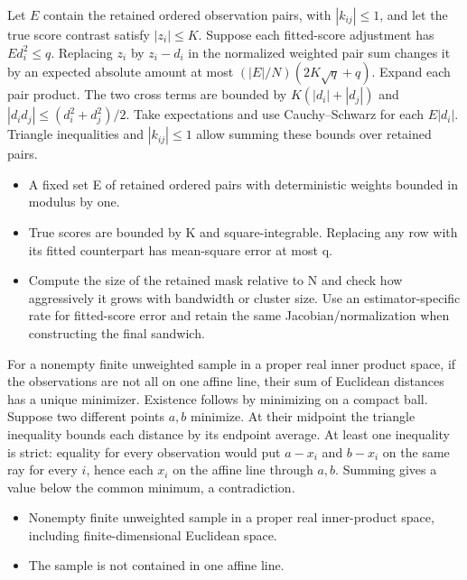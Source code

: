 \expandafter\def\csname statadic@statement@STATADIC-COVBRIDGE-001\endcsname{Let $E$ contain the retained ordered observation pairs,
  with $|k_{ij}|\le1$, and let the true score contrast satisfy $|z_i|\le K$.
  Suppose each fitted-score adjustment has $E d_i^2\le q$. Replacing $z_i$
  by $z_i-d_i$ in the normalized weighted pair sum changes it by an expected
  absolute amount at most $(|E|/N)(2K\sqrt q+q)$.}
\expandafter\def\csname statadic@proof@STATADIC-COVBRIDGE-001\endcsname{Expand each pair product. The two cross terms are bounded by
  $K(|d_i|+|d_j|)$ and $|d_i d_j|\le(d_i^2+d_j^2)/2$. Take expectations
  and use Cauchy--Schwarz for each $E|d_i|$. Triangle inequalities and
  $|k_{ij}|\le1$ allow summing these bounds over retained pairs.}
\expandafter\def\csname statadic@assumptions@STATADIC-COVBRIDGE-001\endcsname{\begin{itemize}
\item A fixed set E of retained ordered pairs with deterministic weights bounded in modulus by one.
\item True scores are bounded by K and square-integrable. Replacing any row with its fitted counterpart has mean-square error at most q.
\end{itemize}}
\expandafter\def\csname statadic@diagnostics@STATADIC-COVBRIDGE-001\endcsname{\begin{itemize}
\item Compute the size of the retained mask relative to N and check how aggressively it grows with bandwidth or cluster size. Use an estimator-specific rate for fitted-score error and retain the same Jacobian/normalization when constructing the final sandwich.
\end{itemize}}
\expandafter\def\csname statadic@statement@STATADIC-MEDIAN-004\endcsname{For a nonempty finite unweighted sample in a proper real inner
  product space, if the observations are not all on one affine line, their
  sum of Euclidean distances has a unique minimizer.}
\expandafter\def\csname statadic@proof@STATADIC-MEDIAN-004\endcsname{Existence follows by minimizing on a compact ball. Suppose two
  different points $a,b$ minimize. At their midpoint the triangle inequality
  bounds each distance by its endpoint average. At least one inequality is strict:
  equality for every observation would put $a-x_i$ and $b-x_i$ on the same ray
  for every $i$, hence each $x_i$ on the affine line through $a,b$. Summing gives
  a value below the common minimum, a contradiction.}
\expandafter\def\csname statadic@assumptions@STATADIC-MEDIAN-004\endcsname{\begin{itemize}
\item Nonempty finite unweighted sample in a proper real inner-product space, including finite-dimensional Euclidean space.
\item The sample is not contained in one affine line.
\end{itemize}}
